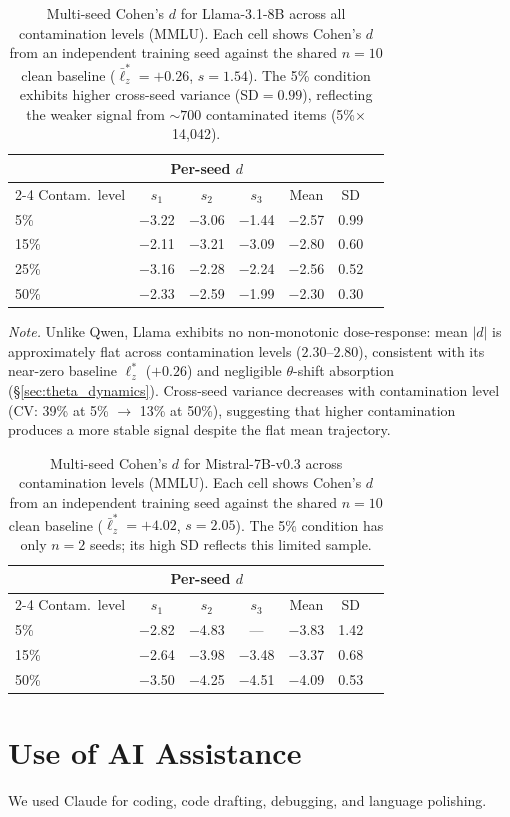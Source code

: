 \begin{table}[ht!]
\centering
\caption{Multi-seed Cohen's $d$ for Llama-3.1-8B across all contamination levels (MMLU). Each cell shows Cohen's $d$ from an independent training seed against the shared $n{=}10$ clean baseline ($\bar{\ell}_z^* = {+}0.26$, $s = 1.54$). The 5\% condition exhibits higher cross-seed variance (SD${=}0.99$), reflecting the weaker signal from ${\sim}700$ contaminated items (5\%$\times$14{,}042).}
\label{tab:llama_multiseed}
\footnotesize
\begin{tabular}{@{}lcccccc@{}}
\toprule
& \multicolumn{3}{c}{Per-seed $d$} & & \\
\cmidrule(lr){2-4}
Contam.\ level & $s_1$ & $s_2$ & $s_3$ & Mean & SD \\
\midrule
5\%  & $-$3.22 & $-$3.06 & $-$1.44 & $-$2.57 & 0.99 \\
15\% & $-$2.11 & $-$3.21 & $-$3.09 & $-$2.80 & 0.60 \\
25\% & $-$3.16 & $-$2.28 & $-$2.24 & $-$2.56 & 0.52 \\
50\% & $-$2.33 & $-$2.59 & $-$1.99 & $-$2.30 & 0.30 \\
\bottomrule
\end{tabular}
\vspace{0.5em}

\noindent\textit{Note.} Unlike Qwen, Llama exhibits no non-monotonic dose-response: mean $|d|$ is approximately flat across contamination levels ($2.30$--$2.80$), consistent with its near-zero baseline $\ell_z^*$ ($+0.26$) and negligible $\theta$-shift absorption (\S\ref{sec:theta_dynamics}). Cross-seed variance decreases with contamination level (CV: 39\% at 5\% $\to$ 13\% at 50\%), suggesting that higher contamination produces a more stable signal despite the flat mean trajectory.
\end{table}

\begin{table}[ht!]
\centering
\caption{Multi-seed Cohen's $d$ for Mistral-7B-v0.3 across contamination levels (MMLU). Each cell shows Cohen's $d$ from an independent training seed against the shared $n{=}10$ clean baseline ($\bar{\ell}_z^* = {+}4.02$, $s = 2.05$). The 5\% condition has only $n{=}2$ seeds; its high SD reflects this limited sample.}
\label{tab:mistral_multiseed}
\footnotesize
\begin{tabular}{@{}lcccccc@{}}
\toprule
& \multicolumn{3}{c}{Per-seed $d$} & & \\
\cmidrule(lr){2-4}
Contam.\ level & $s_1$ & $s_2$ & $s_3$ & Mean & SD \\
\midrule
5\%  & $-$2.82 & $-$4.83 & --- & $-$3.83 & 1.42 \\
15\% & $-$2.64 & $-$3.98 & $-$3.48 & $-$3.37 & 0.68 \\
50\% & $-$3.50 & $-$4.25 & $-$4.51 & $-$4.09 & 0.53 \\
\bottomrule
\end{tabular}
\end{table}

\section{Use of AI Assistance}
We used Claude for coding, code drafting, debugging, and language polishing.
